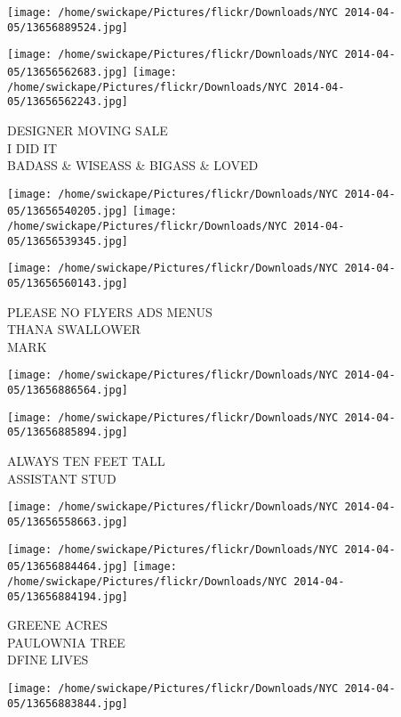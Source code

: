 \documentclass[10pt,letterpaper]{article}
\begin{document}
\texttt{[image: /home/swickape/Pictures/flickr/Downloads/NYC 2014-04-05/13656889524.jpg]}

\vspace{0.25in}
\texttt{[image: /home/swickape/Pictures/flickr/Downloads/NYC 2014-04-05/13656562683.jpg]}
\texttt{[image: /home/swickape/Pictures/flickr/Downloads/NYC 2014-04-05/13656562243.jpg]}

DESIGNER MOVING SALE\\
I DID IT\\
BADASS \& WISEASS \& BIGASS \& LOVED\\
\pagebreak

\texttt{[image: /home/swickape/Pictures/flickr/Downloads/NYC 2014-04-05/13656540205.jpg]}
\texttt{[image: /home/swickape/Pictures/flickr/Downloads/NYC 2014-04-05/13656539345.jpg]}

\vspace{0.25in}
\texttt{[image: /home/swickape/Pictures/flickr/Downloads/NYC 2014-04-05/13656560143.jpg]}

PLEASE NO FLYERS ADS MENUS\\
THANA SWALLOWER\\
MARK\\
\pagebreak

\texttt{[image: /home/swickape/Pictures/flickr/Downloads/NYC 2014-04-05/13656886564.jpg]}

\vspace{0.25in}
\texttt{[image: /home/swickape/Pictures/flickr/Downloads/NYC 2014-04-05/13656885894.jpg]}

ALWAYS TEN FEET TALL\\
ASSISTANT STUD\\
\pagebreak

\texttt{[image: /home/swickape/Pictures/flickr/Downloads/NYC 2014-04-05/13656558663.jpg]}

\vspace{0.25in}
\texttt{[image: /home/swickape/Pictures/flickr/Downloads/NYC 2014-04-05/13656884464.jpg]}
\texttt{[image: /home/swickape/Pictures/flickr/Downloads/NYC 2014-04-05/13656884194.jpg]}

GREENE ACRES\\
PAULOWNIA TREE\\
DFINE LIVES\\
\pagebreak

\texttt{[image: /home/swickape/Pictures/flickr/Downloads/NYC 2014-04-05/13656883844.jpg]}
\end{document}
